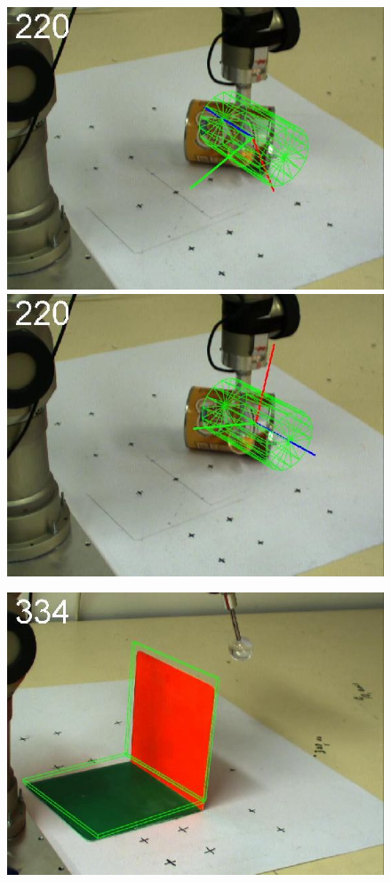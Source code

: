 \begin{figure}[htbp]
{\includegraphics[width=\imgAXwid]{images/A3_LWPR1_39_4}
\includegraphics[width=\imgAXwid]{images/A3_physx_39_4}
}
\centerline{
\includegraphics[width=\imgAXwid]{images/A1_2exp_667_5}
}
\end{figure}
